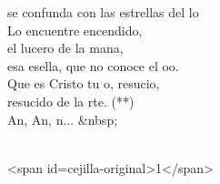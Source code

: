 \begin{cancion}
\begin{chorus}
	se confunda con las estrellas del lo\\
Lo encuentre encendido,\\
	el lucero de la mana,\\
	esa esella, que no conoce el oo.\\
	Que es Cristo tu o, resucio,\\
	resucido de la rte. (**)\\
	An, An, n... &nbsp; \\
	\end{chorus}%
	\jump\\
<span id=cejilla-original>1</span>\\
\end{cancion}%
